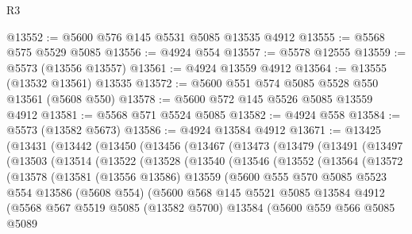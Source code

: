 \begin{lexlean}{R3}
\begin{coremodule}
@13552 := @5600 @576 @145 @5531 @5085 @13535 @4912
@13555 := @5568 @575 @5529 @5085
@13556 := @4924 @554
@13557 := @5578 @12555
@13559 := @5573 (@13556 @13557)
@13561 := @4924 @13559 @4912
@13564 := @13555 (@13532 @13561) @13535
@13572 := @5600 @551 @574 @5085 @5528 @550 @13561 (@5608 @550)
@13578 := @5600 @572 @145 @5526 @5085 @13559 @4912
@13581 := @5568 @571 @5524 @5085
@13582 := @4924 @558
@13584 := @5573 (@13582 @5673)
@13586 := @4924 @13584 @4912
@13671 := @13425
    (@13431
      (@13442
        (@13450
          (@13456
            (@13467
              (@13473
                (@13479
                  (@13491
                    (@13497
                      (@13503
                        (@13514
                          (@13522
                            (@13528
                              (@13540
                                (@13546
                                  (@13552
                                    (@13564
                                      (@13572
                                        (@13578
                                          (@13581
                                            (@13556 @13586)
                                            @13559
                                            (@5600
                                              @555
                                              @570
                                              @5085
                                              @5523
                                              @554
                                              @13586
                                              (@5608 @554)
                                              (@5600
                                                @568
                                                @145
                                                @5521
                                                @5085
                                                @13584
                                                @4912
                                                (@5568
                                                  @567
                                                  @5519
                                                  @5085
                                                  (@13582 @5700)
                                                  @13584
                                                  (@5600
                                                    @559
                                                    @566
                                                    @5085
                                                    @5089

\end{coremodule}
\end{lexlean}
